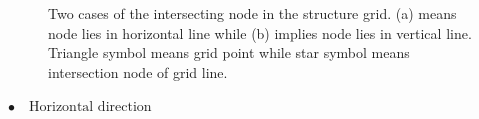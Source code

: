 \begin{figure}[hbpt!]
    \centering
    \caption{Two cases of the intersecting node in the structure grid. (a) means node lies in horizontal line while (b) implies node lies in vertical line. Triangle symbol means grid point while star symbol means intersection node of grid line. }
    \label{fig:enter-label}
\end{figure}
\noindent
$\bullet \quad \text{Horizontal direction}$

